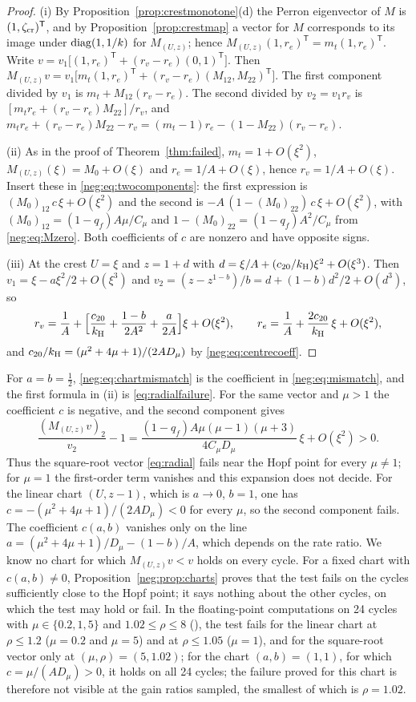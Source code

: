 \begin{proof}
(i) By Proposition~\ref{prop:crestmonotone}(d) the Perron eigenvector of $M$ is $(1,\zeta_{\rm cr})^{\mathsf T}$, and by Proposition~\ref{prop:crestmap} a vector for $M$ corresponds to its image under $\operatorname{diag}(1,1/k)$ for $M_{(U,z)}$; hence $M_{(U,z)}(1,r_e)^{\mathsf T}=m_t(1,r_e)^{\mathsf T}$. Write $v=v_1\bigl[(1,r_e)^{\mathsf T}+(r_v-r_e)(0,1)^{\mathsf T}\bigr]$. Then $M_{(U,z)}v=v_1\bigl[m_t(1,r_e)^{\mathsf T}+(r_v-r_e)(M_{12},M_{22})^{\mathsf T}\bigr]$. The first component divided by $v_1$ is $m_t+M_{12}(r_v-r_e)$. The second divided by $v_2=v_1r_v$ is $[m_tr_e+(r_v-r_e)M_{22}]/r_v$, and $m_tr_e+(r_v-r_e)M_{22}-r_v=(m_t-1)r_e-(1-M_{22})(r_v-r_e)$.

(ii) As in the proof of Theorem~\ref{thm:failed}, $m_t=1+O(\xi^2)$, $M_{(U,z)}(\xi)=M_0+O(\xi)$ and $r_e=1/A+O(\xi)$, hence $r_v=1/A+O(\xi)$. Insert these in \eqref{neg:eq:twocomponents}: the first expression is $(M_0)_{12}\,c\,\xi+O(\xi^2)$ and the second is $-A\,(1-(M_0)_{22})\,c\,\xi+O(\xi^2)$, with $(M_0)_{12}=(1-q_f)A\mu/C_\mu$ and $1-(M_0)_{22}=(1-q_f)A^2/C_\mu$ from \eqref{neg:eq:Mzero}. Both coefficients of $c$ are nonzero and have opposite signs.

(iii) At the crest $U=\xi$ and $z=1+d$ with $d=\xi/A+(c_{20}/k_{\mathrm H})\xi^2+O(\xi^3)$. Then $v_1=\xi-a\xi^2/2+O(\xi^3)$ and $v_2=(z-z^{1-b})/b=d+(1-b)d^2/2+O(d^3)$, so
\[
r_v=\frac1A+\Bigl[\frac{c_{20}}{k_{\mathrm H}}+\frac{1-b}{2A^2}+\frac{a}{2A}\Bigr]\xi+O(\xi^2),\qquad
r_e=\frac1A+\frac{2c_{20}}{k_{\mathrm H}}\,\xi+O(\xi^2),
\]
and $c_{20}/k_{\mathrm H}=(\mu^2+4\mu+1)/(2AD_\mu)$ by \eqref{neg:eq:centrecoeff}.
\end{proof}
For $a=b=\tfrac12$, \eqref{neg:eq:chartmismatch} is the coefficient in \eqref{neg:eq:mismatch}, and the first formula in (ii) is \eqref{eq:radialfailure}. For the same vector and $\mu>1$ the coefficient $c$ is negative, and the second component gives
\[
\frac{(M_{(U,z)}v)_2}{v_2}-1=\frac{(1-q_f)A\mu(\mu-1)(\mu+3)}{4C_\mu D_\mu}\,\xi+O(\xi^2)>0 .
\]
Thus the square-root vector \eqref{eq:radial} fails near the Hopf point for every $\mu\ne1$; for $\mu=1$ the first-order term vanishes and this expansion does not decide. For the linear chart $(U,z-1)$, which is $a\to0$, $b=1$, one has $c=-(\mu^2+4\mu+1)/(2AD_\mu)<0$ for every $\mu$, so the second component fails. The coefficient $c(a,b)$ vanishes only on the line $a=(\mu^2+4\mu+1)/D_\mu-(1-b)/A$, which depends on the rate ratio. We know no chart for which $M_{(U,z)}v<v$ holds on every cycle. For a fixed chart with $c(a,b)\ne0$, Proposition~\ref{neg:prop:charts} proves that the test fails on the cycles sufficiently close to the Hopf point; it says nothing about the other cycles, on which the test may hold or fail. In the floating-point computations on 24 cycles with $\mu\in\{0.2,1,5\}$ and $1.02\le\rho\le8$ (), the test fails for the linear chart at $\rho\le1.2$ ($\mu=0.2$ and $\mu=5$) and at $\rho\le1.05$ ($\mu=1$), and for the square-root vector only at $(\mu,\rho)=(5,1.02)$; for the chart $(a,b)=(1,1)$, for which $c=\mu/(AD_\mu)>0$, it holds on all 24 cycles; the failure proved for this chart is therefore not visible at the gain ratios sampled, the smallest of which is $\rho=1.02$.

